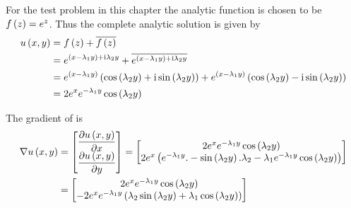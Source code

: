 For the test problem in this chapter the analytic function is chosen to be
$ f\left( z \right) =e^{z}$. Thus the complete analytic solution is given by
\begin{equation}
  \begin{split}
    \fnof{u}{x,y}&=\fnof{f}{z}+\overline{\fnof{f}{z}} \\
    &= e^{\pbrac{x-\lambda_{1}y}+\complex{i}\lambda_{2}y}+
    \overline{e^{\pbrac{x-\lambda_{1}y}+\complex{i}\lambda_{2}y}} \\
    &= e^{\pbrac{x-\lambda_{1}y}}\pbrac{\cosine{\lambda_{2}y}+\complex{i}
      \sine{\lambda_{2}y}}+e^{\pbrac{x-\lambda_{1}y}}
    \pbrac{\cosine{\lambda_{2}y}-\complex{i}\sine{\lambda_{2}y}} \\
    &= 2e^{x}e^{-\lambda_{1}{y}}\cosine{\lambda_{2}y}
  \end{split}
  \label{eqn:GeneralisedLaplaceTwoDAnalytic1}
\end{equation}


The gradient of  is
\begin{equation}
  \begin{aligned}
    \gradient{}{\fnof{u}{x,y}}&=\begin{bmatrix}
    \delby{\fnof{u}{x,y}}{x} \\
    \delby{\fnof{u}{x,y}}{y}
    \end{bmatrix}=\begin{bmatrix}
    2e^{x}e^{-\lambda_{1}{y}}\cosine{\lambda_{2}y} \\
    2e^{x}\pbrac{e^{-\lambda_{1}{y}}.-\sine{\lambda_{2}y}.\lambda_{2}-\lambda_{1}e^{-\lambda_{1}{y}}\cosine{\lambda_{2}y}}
    \end{bmatrix} \\
    &=\begin{bmatrix}
    2e^{x}e^{-\lambda_{1}{y}}\cosine{\lambda_{2}y} \\
    -2e^{x}e^{-\lambda_{1}{y}}\pbrac{\lambda_{2}\sine{\lambda_{2}y}+\lambda_{1}\cosine{\lambda_{2}y}}
    \end{bmatrix}
  \end{aligned}
  \label{eqn:GeneralisedLaplaceTwoDAnalyticGradient1}
\end{equation}

